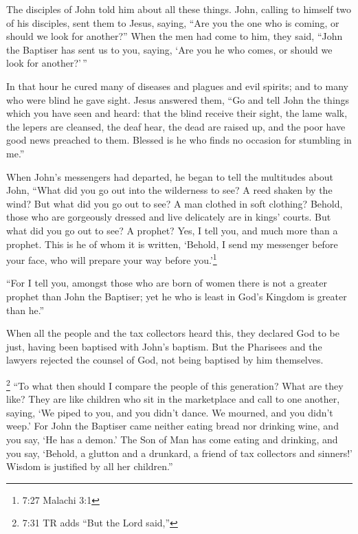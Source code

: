 The disciples of John told him about all these things.
 John, calling to himself two of his disciples, sent them
to Jesus, saying, ``Are you the one who is coming, or should we look for
another?''  When the men had come to him, they said, ``John
the Baptiser has sent us to you, saying, `Are you he who comes, or
should we look for another?'\,''

 In that hour he cured many of diseases and plagues and
evil spirits; and to many who were blind he gave sight. 
Jesus answered them, ``Go and tell John the things which you have seen
and heard: that the blind receive their sight, the lame walk, the lepers
are cleansed, the deaf hear, the dead are raised up, and the poor have
good news preached to them.  Blessed is he who finds no
occasion for stumbling in me.''

 When John's messengers had departed, he began to tell the
multitudes about John, ``What did you go out into the wilderness to see?
A reed shaken by the wind?  But what did you go out to see?
A man clothed in soft clothing? Behold, those who are gorgeously dressed
and live delicately are in kings' courts.  But what did you
go out to see? A prophet? Yes, I tell you, and much more than a prophet.
 This is he of whom it is written, `Behold, I send my
messenger before your face, who will prepare your way before
you.'\footnote{7:27 Malachi 3:1}

 ``For I tell you, amongst those who are born of women
there is not a greater prophet than John the Baptiser; yet he who is
least in God's Kingdom is greater than he.''

 When all the people and the tax collectors heard this,
they declared God to be just, having been baptised with John's baptism.
 But the Pharisees and the lawyers rejected the counsel of
God, not being baptised by him themselves.

 \footnote{7:31 TR adds ``But the Lord said,''} ``To what
then should I compare the people of this generation? What are they like?
 They are like children who sit in the marketplace and call
to one another, saying, `We piped to you, and you didn't dance. We
mourned, and you didn't weep.'  For John the Baptiser came
neither eating bread nor drinking wine, and you say, `He has a demon.'
 The Son of Man has come eating and drinking, and you say,
`Behold, a glutton and a drunkard, a friend of tax collectors and
sinners!'  Wisdom is justified by all her children.''

